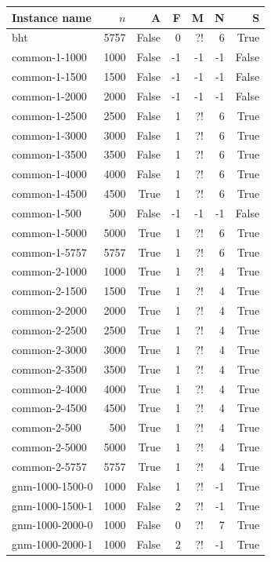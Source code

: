 \begin{tabular}{lrrrrrr}
    \toprule
    Instance name & $n$ & A & F & M & N & S \\
    \midrule
    bht & 5757 & False & 0 & ?! & 6 & True \\
common-1-1000 & 1000 & False & -1 & -1 & -1 & False \\
common-1-1500 & 1500 & False & -1 & -1 & -1 & False \\
common-1-2000 & 2000 & False & -1 & -1 & -1 & False \\
common-1-2500 & 2500 & False & 1 & ?! & 6 & True \\
common-1-3000 & 3000 & False & 1 & ?! & 6 & True \\
common-1-3500 & 3500 & False & 1 & ?! & 6 & True \\
common-1-4000 & 4000 & False & 1 & ?! & 6 & True \\
common-1-4500 & 4500 & True & 1 & ?! & 6 & True \\
common-1-500 & 500 & False & -1 & -1 & -1 & False \\
common-1-5000 & 5000 & True & 1 & ?! & 6 & True \\
common-1-5757 & 5757 & True & 1 & ?! & 6 & True \\
common-2-1000 & 1000 & True & 1 & ?! & 4 & True \\
common-2-1500 & 1500 & True & 1 & ?! & 4 & True \\
common-2-2000 & 2000 & True & 1 & ?! & 4 & True \\
common-2-2500 & 2500 & True & 1 & ?! & 4 & True \\
common-2-3000 & 3000 & True & 1 & ?! & 4 & True \\
common-2-3500 & 3500 & True & 1 & ?! & 4 & True \\
common-2-4000 & 4000 & True & 1 & ?! & 4 & True \\
common-2-4500 & 4500 & True & 1 & ?! & 4 & True \\
common-2-500 & 500 & True & 1 & ?! & 4 & True \\
common-2-5000 & 5000 & True & 1 & ?! & 4 & True \\
common-2-5757 & 5757 & True & 1 & ?! & 4 & True \\
gnm-1000-1500-0 & 1000 & False & 1 & ?! & -1 & True \\
gnm-1000-1500-1 & 1000 & False & 2 & ?! & -1 & True \\
gnm-1000-2000-0 & 1000 & False & 0 & ?! & 7 & True \\
gnm-1000-2000-1 & 1000 & False & 2 & ?! & -1 & True \\

\end{tabular}
